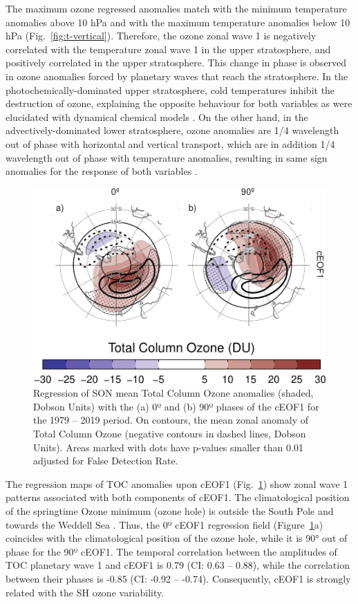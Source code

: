 \documentclass[pdflatex,sn-basic]{sn-jnl}
\theoremstyle{thmstyleone}%
\theoremstyle{thmstyletwo}%
\theoremstyle{thmstylethree}%
\begin{document}
The maximum ozone regressed anomalies match with the minimum temperature anomalies above 10 hPa and with the maximum temperature anomalies below 10 hPa (Fig.~\ref{fig:t-vertical}).
Therefore, the ozone zonal wave 1 is negatively correlated with the temperature zonal wave 1 in the upper stratosphere, and positively correlated in the upper stratosphere.
This change in phase is observed in ozone anomalies forced by planetary waves that reach the stratosphere.
In the photochemically-dominated upper stratosphere, cold temperatures inhibit the destruction of ozone, explaining the opposite behaviour for both variables as were elucidated with dynamical chemical models \citep{hartmann1979, wirth1993, smith1995}.
On the other hand, in the advectively-dominated lower stratosphere, ozone anomalies are 1/4 wavelength out of phase with horizontal and vertical transport, which are in addition 1/4 wavelength out of phase with temperature anomalies, resulting in same sign anomalies for the response of both variables \citep{hartmann1979, wirth1993, smith1995}.



\begin{figure}
\centering
\includegraphics{../figures/o3-regr-1.pdf}
\caption{\label{fig:o3-regr}Regression of SON mean Total Column Ozone anomalies (shaded, Dobson Units) with the (a) 0º and (b) 90º phases of the cEOF1 for the 1979 -- 2019 period. On contours, the mean zonal anomaly of Total Column Ozone (negative contours in dashed lines, Dobson Units). Areas marked with dots have p-values smaller than 0.01 adjusted for False Detection Rate.}
\end{figure}



The regression maps of TOC anomalies upon cEOF1 (Fig.~\ref{fig:o3-regr}) show zonal wave 1 patterns associated with both components of cEOF1.
The climatological position of the springtime Ozone minimum (ozone hole) is outside the South Pole and towards the Weddell Sea \citep[e.g.][]{grytsai2011}.
Thus, the 0º cEOF1 regression field (Figure~\ref{fig:o3-regr}a) coincides with the climatological position of the ozone hole, while it is 90° out of phase for the 90º cEOF1.
The temporal correlation between the amplitudes of TOC planetary wave 1 and cEOF1 is 0.79 (CI: 0.63 -- 0.88), while the correlation between their phases is -0.85 (CI: -0.92 -- -0.74).
Consequently, cEOF1 is strongly related with the SH ozone variability.
\end{document}
